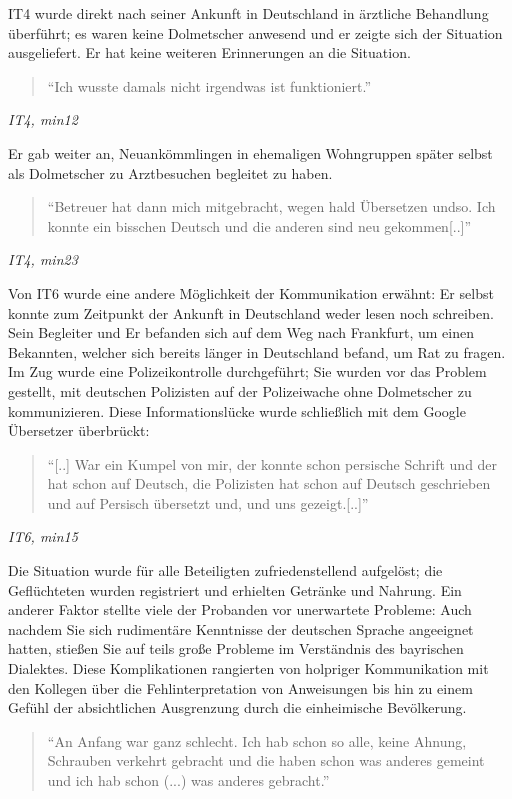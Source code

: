 IT4 wurde direkt nach seiner Ankunft in Deutschland in ärztliche Behandlung überführt; es waren keine Dolmetscher anwesend und er zeigte sich der Situation ausgeliefert. Er hat keine weiteren Erinnerungen an die Situation.
\begin{quote}
    ``Ich wusste damals nicht irgendwas ist funktioniert.''
\end{quote}
\centerline{\textit{IT4, min12}}
Er gab weiter an, Neuankömmlingen in ehemaligen Wohngruppen später selbst als Dolmetscher zu Arztbesuchen begleitet zu haben.
\begin{quote}
    ``Betreuer hat dann mich mitgebracht, wegen hald Übersetzen undso. Ich konnte ein bisschen Deutsch und die anderen sind neu gekommen[..]''
\end{quote}
\centerline{\textit{IT4, min23}}
Von IT6 wurde eine andere Möglichkeit der Kommunikation erwähnt:\newline
Er selbst konnte zum Zeitpunkt der Ankunft in Deutschland weder lesen noch schreiben. Sein Begleiter und Er befanden sich auf dem Weg nach Frankfurt, um einen Bekannten, welcher sich bereits länger in Deutschland befand, um Rat zu fragen. Im Zug wurde eine Polizeikontrolle durchgeführt; Sie wurden vor das Problem gestellt, mit deutschen Polizisten auf der Polizeiwache ohne Dolmetscher zu kommunizieren. Diese Informationslücke wurde schließlich mit dem Google Übersetzer überbrückt:
\begin{quote}
    ``[..] War ein Kumpel von mir, der konnte schon persische Schrift und der hat schon auf Deutsch, die Polizisten hat schon auf Deutsch geschrieben und auf Persisch übersetzt und, und uns gezeigt.[..]''
\end{quote}
\centerline{\textit{IT6, min15}}
Die Situation wurde für alle Beteiligten zufriedenstellend aufgelöst; die Geflüchteten wurden registriert und erhielten Getränke und Nahrung.
Ein anderer Faktor stellte viele der Probanden vor unerwartete Probleme:\newline
Auch nachdem Sie sich rudimentäre Kenntnisse der deutschen Sprache angeeignet hatten, stießen Sie auf teils große Probleme im Verständnis des bayrischen Dialektes. Diese Komplikationen rangierten von holpriger Kommunikation mit den Kollegen über die Fehlinterpretation von Anweisungen bis hin zu einem Gefühl der absichtlichen Ausgrenzung durch die einheimische Bevölkerung. \newline
\begin{quote}
    ``An Anfang war ganz schlecht. Ich hab schon so alle, keine Ahnung, Schrauben verkehrt gebracht und die haben schon was anderes gemeint und ich hab schon (...) was anderes gebracht.''
\end{quote}
